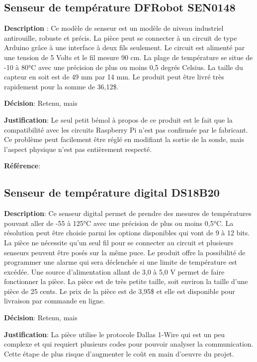 \subsection{Senseur de température DFRobot SEN0148 } 

\textbf{Description} : Ce modèle de senseur est un modèle de niveau industriel antirouille, robuste et précis. La pièce peut se connecter à un circuit de type Arduino grâce à une interface à deux fils seulement. Le circuit est alimenté par une tension de 5 Volts et le fil mesure 90 cm. La plage de température se situe de -10 à 80°C avec une précision de plus ou moins 0,5 degrés Celsius. La taille du capteur en soit est de 49 mm par 14 mm. Le produit peut être livré très rapidement pour la somme de 36,12\$. 

\textbf{Décision}: Retenu, mais

\textbf{Justification}: Le seul petit bémol à propos de ce produit est le fait que la compatibilité avec les circuits Raspberry Pi n’est pas confirmée par le fabricant. Ce problème peut facilement être réglé en modifiant la sortie de la sonde, mais l’aspect physique n’est pas entièrement respecté. 

\textbf{Référence}: \cite{dfrobot}



\subsection{Senseur de température digital DS18B20 }


\textbf{Description}: Ce senseur digital permet de prendre des mesures de températures pouvant aller de -55 à 125°C avec une précision de plus ou moins 0,5°C. La résolution peut être choisie parmi les options disponibles qui vont de 9 à 12 bits. La pièce ne nécessite qu’un seul fil pour se connecter au circuit et plusieurs senseurs peuvent être posés sur la même puce. Le produit offre la possibilité de programmer une alarme qui sera déclenchée si une limite de température est excédée. Une source d’alimentation allant de 3,0 à 5,0 V permet de faire fonctionner la pièce. La pièce est de très petite taille, soit environ la taille d’une pièce de 25 cents. Le prix de la pièce est de 3,95\$ et elle est disponible pour livraison par commande en ligne. 

\textbf{Décision}: Retenu, mais

\textbf{Justification}: La pièce utilise le protocole Dallas 1-Wire qui est un peu complexe et qui requiert plusieurs codes pour pouvoir analyser la communication. Cette étape de plus risque d’augmenter le coût en main d'oeuvre du projet.

